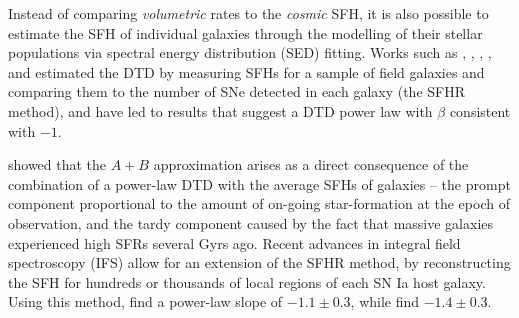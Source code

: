 \documentclass[fleqn,usenatbib]{mnras}
\begin{document}
Instead of comparing \textit{volumetric} rates to the \textit{cosmic} SFH, it is also possible to estimate the SFH of individual galaxies through the modelling of their stellar populations via spectral energy distribution (SED) fitting. Works such as \citet{Totani2008}, \citet{Maoz2011}, \citet{Maoz2012}, \citet{Graur2013}, and \citet{Graur2015} estimated the DTD by measuring SFHs for a sample of field galaxies and comparing them to the number of SNe detected in each galaxy (the SFHR method), and have led to results that suggest a DTD power law with $\beta$ consistent with $-1$. 

\citet[][hereafter C14]{Childress2014} showed that the $A+B$ approximation arises as a direct consequence of the combination of a power-law DTD with the average SFHs of galaxies -- the prompt component proportional to the amount of on-going star-formation at the epoch of observation, and the tardy component caused by the fact that massive galaxies experienced high SFRs several Gyrs ago. Recent advances in integral field spectroscopy (IFS) allow for an extension of the SFHR method, by reconstructing the SFH for hundreds or thousands of local regions of each SN Ia host galaxy. Using this method, \citet{Castrillo2020} find a power-law slope of $-1.1\pm0.3$, while \citet{Chen2021} find $-1.4\pm0.3$.
\end{document}
